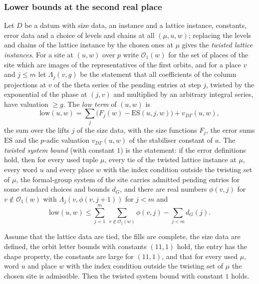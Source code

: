 \subsubsection{Lower bounds at the second real place}\label{pf:reckernel:sec-second}
Let $D$ be a datum with size data, an instance and a lattice instance, constants, error data and a choice of levels and
chains at all $(\mu,u,w)$; replacing the levels and chains of the lattice instance by the chosen ones at $\mu$ gives the
\emph{twisted lattice instances}. For a site at $(u,w)$ over $p$ write $\mathcal O_1(w)$ for the set of places of the
site which are images of the representatives of the first orbits, and for a place $v$ and $j\le m$ let $\Lambda_j(v,g)$
be the statement that all coefficients of the column projections at $v$ of the theta series of the pending entries at
step $j$, twisted by the exponential of the phase at $(j,v)$ and multiplied by an arbitrary integral series, have
valuation $\ge g$. The \emph{low term} of $(u,w)$ is
\[
\mathrm{low}(u,w)=\sum_{j}\bigl(F_j(w)-\mathrm{ES}(u,j,w)\bigr)+v_{D\Gamma}(u,w),
\]
the sum over the lifts $j$ of the size data, with the size functions $F_j$, the error sums $\mathrm{ES}$ and the
$p$-adic valuation $v_{D\Gamma}(u,w)$ of the stabiliser constant of $u$. The \emph{twisted system bound} (with constant
$1$) is the statement: if the error definitions hold, then for every used tuple $\mu$, every tie of the twisted lattice
instance at $\mu$, every word $u$ and every place $w$ with the index condition outside the twisting set of $\mu$, the
formal-group system of the site carries admitted pending entries for some standard choices and bounds $d_G$, and there are
real numbers $\phi(v,j)$ for $v\notin\mathcal O_1(w)$ with $\Lambda_j(v,\phi(v,j+1))$ for $j<m$ and
\begin{equation}\label{pf:reckernel:eq-low}
\mathrm{low}(u,w)\le\sum_{j=1}^{m}\ \sum_{v\notin\mathcal O_1(w)}\phi(v,j)-\sum_{j<m}d_G(j).
\end{equation}

\begin{theorem}\label{pf:reckernel:secondPlace}
Assume that the lattice data are tied, the fills are complete, the size data are defined, the orbit letter bounds with
constants $(11,1)$ hold, the entry has the shape property, the constants are large for $(11,1)$, and that for every used
$\mu$, word $u$ and place $w$ with the index condition outside the twisting set of $\mu$ the chosen site is admissible.
Then the twisted system bound with constant $1$ holds.
\end{theorem}

